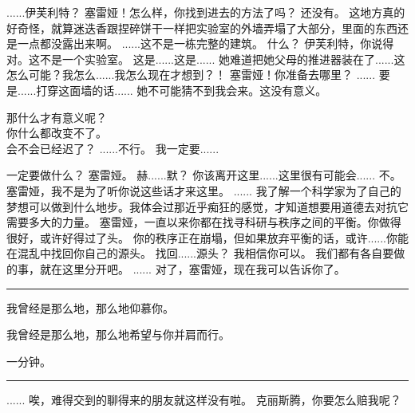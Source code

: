 \documentclass[openany]{book}
\begin{document}
\begin{dialogue}
     ......伊芙利特？
     塞雷娅！怎么样，你找到进去的方法了吗？
     还没有。
     这地方真的好奇怪，就算迷迭香跟捏碎饼干一样把实验室的外墙弄塌了大部分，里面的东西还是一点都没露出来啊。
     ......这不是一栋完整的建筑。
     什么？
     伊芙利特，你说得对。这不是一个实验室。
     这是......这是......
     她难道把她父母的推进器装在了......这怎么可能？我怎么......我怎么现在才想到？！
     塞雷娅！你准备去哪里？
     ......
     要是......打穿这面墙的话......
     她不可能猜不到我会来。这没有意义。\par
    那什么才有意义呢？\\
    你什么都改变不了。\\
    会不会已经迟了？
     ......不行。
     我一定要......\par
    一定要做什么？
     塞雷娅。
     赫......默？
     你该离开这里......这里很有可能会......
     不。
     塞雷娅，我不是为了听你说这些话才来这里。
     ......
     我了解一个科学家为了自己的梦想可以做到什么地步。我体会过那近乎痴狂的感觉，才知道想要用道德去对抗它需要多大的力量。
     塞雷娅，一直以来你都在找寻科研与秩序之间的平衡。你做得很好，或许好得过了头。
     你的秩序正在崩塌，但如果放弃平衡的话，或许......你能在混乱中找回你自己的源头。
     找回......源头？
     我相信你可以。
     我们都有各自要做的事，就在这里分开吧。
     ......
     对了，塞雷娅，现在我可以告诉你了。
\end{dialogue}

\par\noindent\rule{\textwidth}{0.4pt}\par
我曾经是那么地，那么地仰慕你。\par
我曾经是那么地，那么地希望与你并肩而行。\par
一分钟。
\par\noindent\rule{\textwidth}{0.4pt}

\begin{dialogue}
     ......
     唉，难得交到的聊得来的朋友就这样没有啦。
     克丽斯腾，你要怎么赔我呢？
\end{dialogue}
\end{document}
